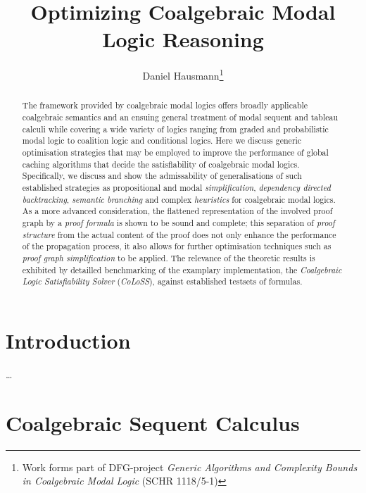 \documentclass{llncs}
\begin{document}
\begin{frontmatter}
  \title{Optimizing Coalgebraic Modal Logic Reasoning}
  \author{Daniel Hausmann\thanks{Work forms part of DFG-project \emph{Generic Algorithms and Complexity
      Bounds in Coalgebraic Modal Logic} (SCHR 1118/5-1)}}
\maketitle
\end{frontmatter}

\begin{abstract} 
The framework provided by coalgebraic modal logics offers
broadly applicable coalgebraic semantics and an ensuing general
treatment of modal sequent and tableau calculi while covering a wide
variety of logics ranging from graded and probabilistic modal logic
to coalition logic and conditional logics. Here we discuss generic optimisation
strategies that may be employed to improve the performance of global
caching algorithms that decide the satisfiability of coalgebraic modal logics.
Specifically, we discuss and show the admissability of generalisations of such
established strategies as propositional and modal \emph{simplification},
\emph{dependency directed backtracking}, \emph{semantic branching} and
complex \emph{heuristics} for coalgebraic modal logics. As a more advanced consideration, the flattened
representation of the involved proof graph by a \emph{proof formula} is shown to be
sound and complete; this separation of \emph{proof structure} from the actual content of
the proof does not only enhance the performance of the propagation
process, it also allows for further optimisation techniques such as
\emph{proof graph simplification} to be applied. The relevance of the
theoretic results is exhibited by detailled benchmarking of the examplary
implementation, the \emph{Coalgebraic Logic Satisfiability Solver}
(\emph{CoLoSS}), against established testsets of formulas.
\end{abstract}


\section{Introduction}\label{intro}
 
\ldots

\section{Coalgebraic Sequent Calculus}
\end{document}
